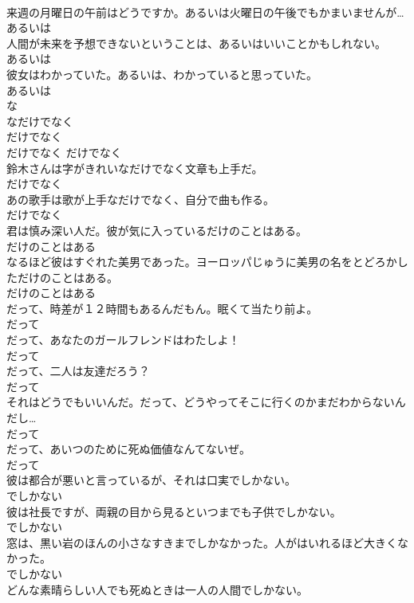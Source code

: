 \documentclass[8pt]{extreport}
\begin{document}
\begin{CJK}{UTF8}{min}
\\	来週の月曜日の午前はどうですか。あるいは火曜日の午後でもかまいませんが…	
\\	あるいは
\\	人間が未来を予想できないということは、あるいはいいことかもしれない。	
\\	あるいは
\\	彼女はわかっていた。あるいは、わかっていると思っていた。	
\\	あるいは
\\	な
\\	なだけでなく	
\\	だけでなく	
\\	だけでなく	だけでなく
\\	鈴木さんは字がきれいなだけでなく文章も上手だ。	
\\	だけでなく
\\	あの歌手は歌が上手なだけでなく、自分で曲も作る。	
\\	だけでなく
\\	君は慎み深い人だ。彼が気に入っているだけのことはある。	
\\	だけのことはある
\\	なるほど彼はすぐれた美男であった。ヨーロッパじゅうに美男の名をとどろかしただけのことはある。	
\\	だけのことはある
\\	だって、時差が１２時間もあるんだもん。眠くて当たり前よ。	
\\	だって
\\	だって、あなたのガールフレンドはわたしよ！	
\\	だって
\\	だって、二人は友達だろう？	
\\	だって
\\	それはどうでもいいんだ。だって、どうやってそこに行くのかまだわからないんだし…	
\\	だって
\\	だって、あいつのために死ぬ価値なんてないぜ。	
\\	だって
\\	彼は都合が悪いと言っているが、それは口実でしかない。	
\\	でしかない
\\	彼は社長ですが、両親の目から見るといつまでも子供でしかない。	
\\	でしかない
\\	窓は、黒い岩のほんの小さなすきまでしかなかった。人がはいれるほど大きくなかった。	
\\	でしかない
\\	どんな素晴らしい人でも死ぬときは一人の人間でしかない。	

\end{CJK}
\end{document}
